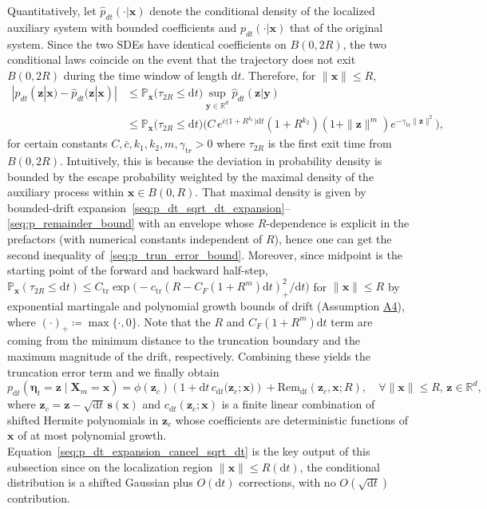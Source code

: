 Quantitatively, let $\hat p_{dt}(\cdot|\bm x)$ denote the conditional density of the localized auxiliary system with bounded coefficients
and $p_{dt}(\cdot|\bm x)$ that of the original system. Since the two SDEs have identical coefficients on $B(0,2R)$,
the two conditional laws coincide on the event that the trajectory does not exit $B(0,2R)$ during the time window of length $\mathrm dt$.
Therefore, for $\|\bm x\|\le R$,
\begin{equation}
\begin{aligned}
    |p_{dt}(\bm z|\bm x)-\hat p_{dt}(\bm z|\bm x)|
    &\le \mathbb{P}_{\bm x}\!\big(\tau_{2R}\le\mathrm dt\big)
    \sup_{\bm y\in\mathbb R^d}\hat p_{dt}(\bm z|\bm y)\\
    &\le \mathbb{P}_{\bm x}\!\big(\tau_{2R}\le\mathrm dt\big)
    \Big(C\,e^{\bar c\big(1+R^{k_1}\big)\mathrm dt} (1+R^{k_2})(1+\|\bm z\|^m)e^{-\gamma_{\mathrm{tr}}\|\bm z\|^2}\Big),
    \label{seq:p_trun_error_bound}
\end{aligned}
\end{equation}
for certain constants $C,\bar c, k_1, k_2, m, \gamma_{\mathrm tr}>0$ where $\tau_{2R}$ is the first exit time from $B(0,2R)$. 
Intuitively, this is because the deviation in probability density is bounded by the escape probability weighted by the maximal density of the auxiliary process within $\bm x\in B(0,R)$.
That maximal density is given by bounded-drift expansion~\eqref{seq:p_dt_sqrt_dt_expansion}--\eqref{seq:p_remainder_bound} with an envelope whose $R$-dependence is explicit in the prefactors (with numerical constants independent of $R$), hence one can get the second inequality of~\eqref{seq:p_trun_error_bound}.
Moreover, since midpoint is the starting point of the forward and backward half-step, $\mathbb{P}_{\bm x}(\tau_{2R}\le\mathrm dt)\le C_{\mathrm{tr}} \exp\big(\!\!-\!c_{\mathrm{tr}}(R-C_F(1+R^m)\mathrm dt)^2_+/\mathrm dt\big)$ for $\|\bm x\|\le R$ by exponential martingale and polynomial growth bounds of drift (Assumption \hyperlink{assumption:A4}{A4}), where $(\cdot)_+\coloneq\max\{\cdot,0\}$. Note that the $R$ and $C_F(1+R^m)\mathrm dt$ term are coming from the minimum distance to the truncation boundary and the maximum magnitude of the drift, respectively. Combining these yields the truncation error term and we finally obtain
\begin{equation}
    p_{\mathrm dt}(\bm\eta_t=\bm z \mid \bm X_m=\bm x)
    =\phi\!\left(\bm z_c\right)
    \!\!\left(1+\mathrm dt\,c_{\mathrm dt}\big(\bm z_c;\bm x\big)\right)
    +\mathrm{Rem}_{\mathrm dt}\!\left(\bm z_c,\bm x;R\right),
    \quad\forall\|\bm x\|\leq R,\,\bm z\in\mathbb R^d,
    \label{seq:p_dt_expansion_cancel_sqrt_dt}
\end{equation}
where $\bm z_c=\bm z-\sqrt{\mathrm dt}\,\bm s(\bm x)$ and $c_{\mathrm dt}(\bm z_c;\bm x)$ is a finite linear combination of shifted Hermite polynomials in $\bm z_c$ whose coefficients are deterministic functions of $\bm x$ of at most polynomial growth. 
Equation~\eqref{seq:p_dt_expansion_cancel_sqrt_dt} is the key output of this subsection since on the localization region $\|\bm x\|\leq R(\mathrm dt)$, the conditional distribution is a shifted Gaussian plus $O(\mathrm dt)$ corrections, with no $O(\sqrt{\mathrm dt})$ contribution.

